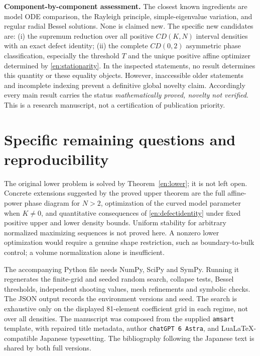 \documentclass[12pt]{amsart}
\theoremstyle{definition}
\theoremstyle{remark}
\numberwithin{equation}{section}
\begin{document}
\noindent\textbf{Component-by-component assessment.}
The closest known ingredients are model ODE comparison, the Rayleigh principle, simple-eigenvalue variation, and regular radial Bessel solutions. None is claimed new. The specific new candidates are: (i) the supremum reduction over all positive $CD(K,N)$ interval densities with an exact defect identity; (ii) the complete $CD(0,2)$ asymmetric phase classification, especially the threshold $T$ and the unique positive affine optimizer determined by \eqref{en:stationarity}. In the inspected statements, no result determines this quantity or these equality objects. However, inaccessible older statements and incomplete indexing prevent a definitive global novelty claim. Accordingly every main result carries the status \emph{mathematically proved, novelty not verified}. This is a research manuscript, not a certification of publication priority.

\section{Specific remaining questions and reproducibility}
The original lower problem is solved by Theorem~\ref{en:lower}; it is not left open. Concrete extensions suggested by the proved upper theorem are the full affine-power phase diagram for $N>2$, optimization of the curved model parameter when $K\ne0$, and quantitative consequences of \eqref{en:defectidentity} under fixed positive upper and lower density bounds. Uniform stability for arbitrary normalized maximizing sequences is not proved here. A nonzero lower optimization would require a genuine shape restriction, such as boundary-to-bulk control; a volume normalization alone is insufficient.

The accompanying Python file needs NumPy, SciPy and SymPy. Running it regenerates the finite-grid and seeded random search, collapse tests, Bessel thresholds, independent shooting values, mesh refinements and symbolic checks. The JSON output records the environment versions and seed. The search is exhaustive only on the displayed 81-element coefficient grid in each regime, not over all densities. The manuscript was composed from the supplied \texttt{amsart} template, with repaired title metadata, author \texttt{chatGPT 6 Astra}, and LuaLaTeX-compatible Japanese typesetting. The bibliography following the Japanese text is shared by both full versions.
\end{document}
